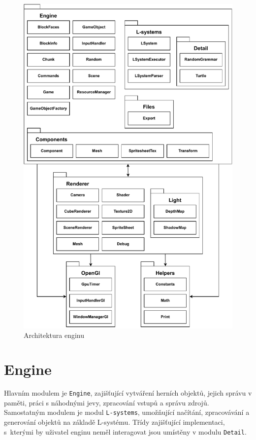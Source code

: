 \documentclass[thesis=M,czech]{FITthesis}[2019/12/23]
\begin{document}
\begin{figure}\centering
	\includegraphics[width=\textwidth]{images/architecture2}
	\caption[Architektura enginu]{Architektura enginu}\label{fig:architecture}
\end{figure}

\section{Engine}

Hlavním modulem je \texttt{Engine}, zajišťující vytváření herních objektů, jejich správu v paměti, práci s náhodnými jevy, zpracování vstupů a správu zdrojů. Samostatným modulem je modul \texttt{L-systems}, umožňující načítání, zpraco\-vá\-vá\-ní a generování objektů na základě L-systému. Třídy zajišťující implementaci, s~kterými by uživatel enginu neměl interagovat jsou umístěny v modulu \texttt{Detail}.
\end{document}
